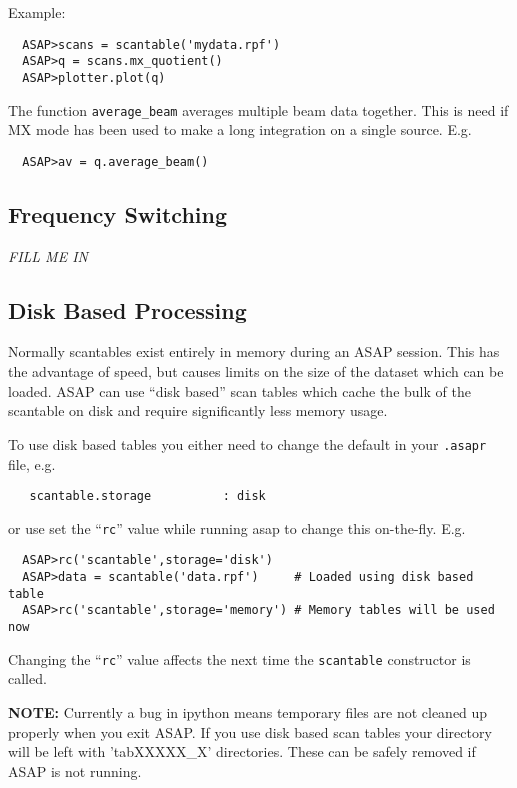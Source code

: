 \documentclass[11pt]{article}
\newcommand{\cmd}[1]{{\tt #1}}
\begin{document}
Example:

\begin{verbatim}
  ASAP>scans = scantable('mydata.rpf')
  ASAP>q = scans.mx_quotient()
  ASAP>plotter.plot(q)
\end{verbatim}

The function \cmd{average\_beam} averages multiple beam data
together. This is need if MX mode has been used to make a long
integration on a single source. E.g.

\begin{verbatim}
  ASAP>av = q.average_beam()
\end{verbatim}

\subsection{Frequency Switching}

{\em FILL ME IN}

\subsection{Disk Based Processing}

Normally scantables exist entirely in memory during an ASAP
session. This has the advantage of speed, but causes limits on the
size of the dataset which can be loaded. ASAP can use ``disk based''
scan tables which cache the bulk of the scantable on disk and require
significantly less memory usage.

To use disk based tables you either need to change the default in your
\cmd{.asapr} file, e.g.
\begin{verbatim}
   scantable.storage          : disk
\end{verbatim}

or use set the ``\cmd{rc}'' value while running asap to change this
on-the-fly. E.g.
\begin{verbatim}
  ASAP>rc('scantable',storage='disk')
  ASAP>data = scantable('data.rpf')     # Loaded using disk based table
  ASAP>rc('scantable',storage='memory') # Memory tables will be used now
\end{verbatim}

Changing the ``\cmd{rc}'' value affects the next time the
\cmd{scantable} constructor is called.

{\bf NOTE: } Currently a bug in ipython means temporary files are not
cleaned up properly when you exit ASAP. If you use disk based scan
tables your directory will be left with 'tabXXXXX\_X' directories. These can
be safely removed if ASAP is not running.
\end{document}
